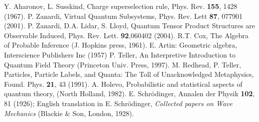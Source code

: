 \documentclass[aps,prl,amsmath,amssymb,twocolumn,nofootinbib]{revtex4}
\theoremstyle{plain}
\theoremstyle{definition}
\theoremstyle{remark}
\begin{document}
\begin{references}
		Y. Aharonov, L. Susskind, Charge superselection
		rule, Phys. Rev. {\bf 155}, 1428 (1967).
		P. Zanardi, Virtual Quantum Subsystems, Phys. Rev.
		Lett {\bf 87}, 077901 (2001).
		 P. Zanardi, D.A. Lidar, S. Lloyd, Quantum
		Tensor Product Structures are Observable Induced, Phys. Rev. Lett.
		{\bf 92},060402 (2004).
		R.T. Cox, The Algebra of Probable Inference (J. Hopkins
		press, 1961).
		 E. Artin: Geometric algebra, Interscience Publishers Inc (1957)
		P. Teller, An Interpretive Introduction to Quantum
		Field Theory (Princeton Univ. Press, 1997).  
		M. Redhead, P. Teller, Particles, Particle Labels, and
		Quanta: The Toll of Unacknowledged Metaphysics, Found. Phys. {\bf
			21}, 43 (1991).
		A. Holevo, Probabilistic and statistical aspects of
		quantum theory, (North Holland, 1982).
		E. Schr\"odinger, Annalen der Physik {\bf 102}, 81 (1926); English translation in E. Schr\"odinger, {\em Collected papers on Wave Mechanics} (Blackie \& Son, London, 1928).
	\end{references}
	
	
	\baselineskip
	
\end{document}
